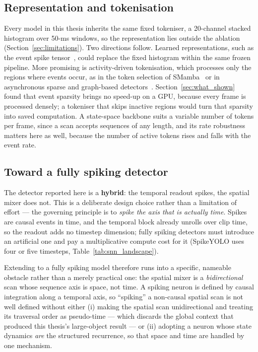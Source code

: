 \documentclass[11pt, a4paper]{report}
\begin{document}
\subsection{Representation and tokenisation}
Every model in this thesis inherits the same fixed tokeniser, a 20-channel stacked histogram over 50-ms
windows, so the representation lies outside the ablation (Section~\ref{sec:limitations}). Two directions
follow. Learned representations, such as the event spike tensor~\cite{gehrig2019end}, could replace the
fixed histogram within the same frozen pipeline. More promising is activity-driven tokenisation, which
processes only the regions where events occur, as in the token selection of SMamba~\cite{yang2025smamba}
or in asynchronous sparse and graph-based detectors~\cite{messikommer2020event,schaefer2022aegnn}.
Section~\ref{sec:what_shown} found that event sparsity brings no speed-up on a GPU, because every frame is
processed densely; a tokeniser that skips inactive regions would turn that sparsity into saved
computation. A state-space backbone suits a variable number of tokens per frame, since a scan accepts
sequences of any length, and its rate robustness matters here as well, because the number of active
tokens rises and falls with the event rate.

\subsection{Toward a fully spiking detector}
\label{subsec:fw_fullspike}
The detector reported here is a \textbf{hybrid}: the temporal readout spikes, the spatial mixer does not.
This is a deliberate design choice rather than a limitation of effort --- the governing principle is to
\emph{spike the axis that is actually time}. Spikes are causal events in time, and the temporal block
already unrolls over clip time, so the readout adds no timestep dimension; fully spiking detectors must
introduce an artificial one and pay a multiplicative compute cost for it (SpikeYOLO uses four or five timesteps, Table~\ref{tab:snn_landscape}).

Extending to a fully spiking model therefore runs into a specific, nameable obstacle rather than a merely
practical one: the spatial mixer is a \emph{bidirectional} scan whose sequence axis is space, not time.
A spiking neuron is defined by causal integration along a temporal axis, so ``spiking'' a non-causal spatial
scan is not well defined without either (i) making the spatial scan unidirectional and treating its
traversal order as pseudo-time --- which discards the global context that produced this thesis's
large-object result --- or (ii) adopting a neuron whose state dynamics \emph{are} the structured recurrence,
so that space and time are handled by one mechanism.
\end{document}
